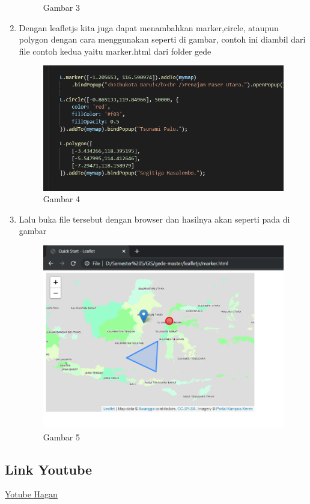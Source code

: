 \begin{enumerate}
\begin{figure}[H]
		\centering
		\caption{Gambar 3}
	\end{figure}
    \item Dengan leafletjs kita juga dapat menambahkan marker,circle, ataupun polygon dengan cara menggunakan seperti di gambar, contoh ini diambil
          dari file contoh kedua yaitu marker.html dari folder gede 
    \hfill\break
    \begin{figure}[H]
		\includegraphics[width=12cm]{figures/1174040/Python4/4.PNG}
		\centering
		\caption{Gambar 4}
	\end{figure}
    \item Lalu buka file tersebut dengan browser dan hasilnya akan seperti pada di gambar
    \hfill\break
    \begin{figure}[H]
		\includegraphics[width=12cm]{figures/1174040/Python4/5.PNG}
		\centering
		\caption{Gambar 5}
	\end{figure}
\end{enumerate}
\subsection{Link Youtube}
\href{https://www.youtube.com/watch?v=z3GK-cLmQT4}{Yotube Hagan}